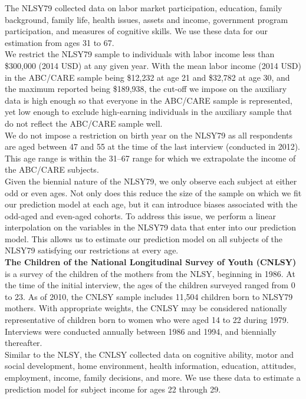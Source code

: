 \noindent The NLSY79 collected data on labor market participation, education, family background, family life, health issues, assets and income, government program participation, and measures of cognitive skills. We use these data for our estimation from ages 31 to 67.\\

\noindent We restrict the NLSY79 sample to individuals with labor income less than \$300,000 (2014 USD) at any given year. With the mean labor income (2014 USD) in the ABC/CARE sample being \$12,232 at age 21 and \$32,782 at age 30, and the maximum reported being \$189,938, the cut-off we impose on the auxiliary data is high enough so that everyone in the ABC/CARE sample is represented, yet low enough to exclude high-earning individuals in the auxiliary sample that do not reflect the ABC/CARE sample well. \\

\noindent We do not impose a restriction on birth year on the NLSY79 as all respondents are aged between 47 and 55 at the time of the last interview (conducted in 2012). This age range is within the 31--67 range for which we extrapolate the income of the ABC/CARE subjects. \\

\noindent Given the biennial nature of the NLSY79, we only observe each subject at either odd or even ages. Not only does this reduce the size of the sample on which we fit our prediction model at each age, but it can introduce biases associated with the odd-aged and even-aged cohorts. To address this issue, we perform a linear interpolation on the variables in the NLSY79 data that enter into our prediction model. This allows us to estimate our prediction model on all subjects of the NLSY79 satisfying our restrictions at every age. \\

\noindent \textbf{The Children of the National Longitudinal Survey of Youth (CNLSY)} is a survey of the children of the mothers from the NLSY, beginning in 1986. At the time of the initial interview, the ages of the children surveyed ranged from 0 to 23. As of 2010, the CNLSY sample includes 11,504 children born to NLSY79 mothers. With appropriate weights, the CNLSY may be considered nationally representative of children born to women who were aged 14 to 22 during 1979. Interviews were conducted annually between 1986 and 1994, and biennially thereafter. \\

\noindent Similar to the NLSY, the CNLSY collected data on cognitive ability, motor and social development, home environment, health information, education, attitudes, employment, income, family decisions, and more. We use these data to estimate a prediction model for subject income for ages 22 through 29. \\

